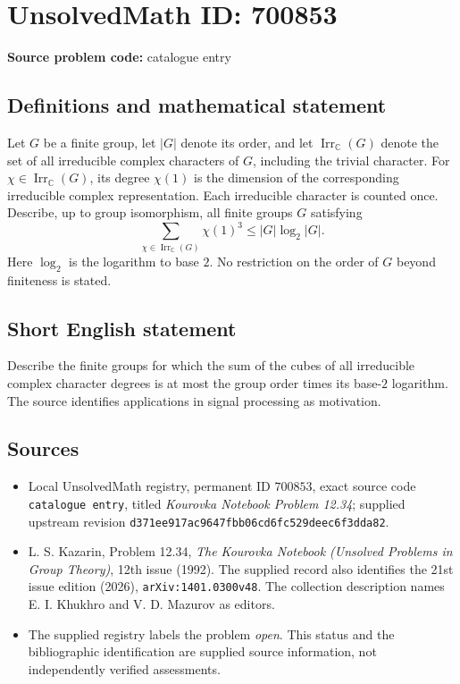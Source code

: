 \documentclass[11pt]{article}
\newcommand{\C}{\mathbb{C}}
\begin{document}
\section*{UnsolvedMath ID: 700853}
\textbf{Source problem code:} catalogue entry
\subsection{Definitions and mathematical statement}
Let \(G\) be a finite group, let \(|G|\) denote its order, and let \(\operatorname{Irr}_{\C}(G)\) denote the set of all irreducible complex characters of \(G\), including the trivial character. For \(\chi\in\operatorname{Irr}_{\C}(G)\), its degree \(\chi(1)\) is the dimension of the corresponding irreducible complex representation. Each irreducible character is counted once. Describe, up to group isomorphism, all finite groups \(G\) satisfying
\[
\sum_{\chi\in\operatorname{Irr}_{\C}(G)}\chi(1)^3
\leq |G|\log_2|G|.
\]
Here \(\log_2\) is the logarithm to base \(2\). No restriction on the order of \(G\) beyond finiteness is stated.
\subsection{Short English statement}
Describe the finite groups for which the sum of the cubes of all irreducible complex character degrees is at most the group order times its base-\(2\) logarithm. The source identifies applications in signal processing as motivation.
\subsection{Sources}
\begin{itemize}
\item Local UnsolvedMath registry, permanent ID \(700853\), exact source code \texttt{catalogue entry}, titled \emph{Kourovka Notebook Problem 12.34}; supplied upstream revision \texttt{d371ee917ac9647fbb06cd6fc529deec6f3dda82}.
\item L. S. Kazarin, Problem 12.34, \emph{The Kourovka Notebook (Unsolved Problems in Group Theory)}, 12th issue (1992). The supplied record also identifies the 21st issue edition (2026), \texttt{arXiv:1401.0300v48}. The collection description names E. I. Khukhro and V. D. Mazurov as editors.
\item The supplied registry labels the problem \emph{open}. This status and the bibliographic identification are supplied source information, not independently verified assessments.
\end{itemize}
\end{document}
